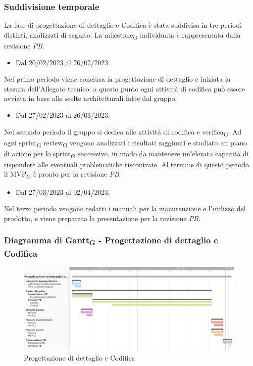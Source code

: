 \subsubsection{Suddivisione temporale}
La fase di progettazione di dettaglio e Codifica è stata suddivisa in tre periodi distinti, analizzati di seguito. La milestone\textsubscript{G} individuata è rappresentata dalla revisione \textit{PB}.

\:
\begin{itemize}
    \item Dal 20/02/2023 al 26/02/2023.
\end{itemize}
Nel primo periodo viene conclusa la progettazione di dettaglio e iniziata la stesura dell’Allegato tecnico: a questo punto ogni attività di codifica può essere avviata in base alle scelte architetturali fatte dal gruppo.

\begin{itemize}
    \item Dal 27/02/2023 al 26/03/2023.
\end{itemize}
Nel secondo periodo il gruppo si dedica alle attività di codifica e verifica\textsubscript{G}. Ad ogni sprint\textsubscript{G} review\textsubscript{G} vengono analizzati i risultati raggiunti e studiato un piano di azione per lo sprint\textsubscript{G} successivo, in modo da mantenere un’elevata capacità di rispondere alle eventuali problematiche riscontrate. Al termine di questo periodo il MVP\textsubscript{G} è pronto per la revisione \textit{PB}.

\:
\begin{itemize}
    \item Dal 27/03/2023 al 02/04/2023.
\end{itemize}
Nel terzo periodo vengono redatti i manuali per la manutenzione e l’utilizzo del prodotto, e viene preparata la presentazione per la revisione \textit{PB}.

\subsubsection{Diagramma di Gantt\textsubscript{G} - Progettazione di dettaglio e Codifica}

\begin{figure}[H]
\centering
\includegraphics[width=\textwidth]{img/4_codifica.png}
\caption{Progettazione di dettaglio e Codifica}
\end{figure}

